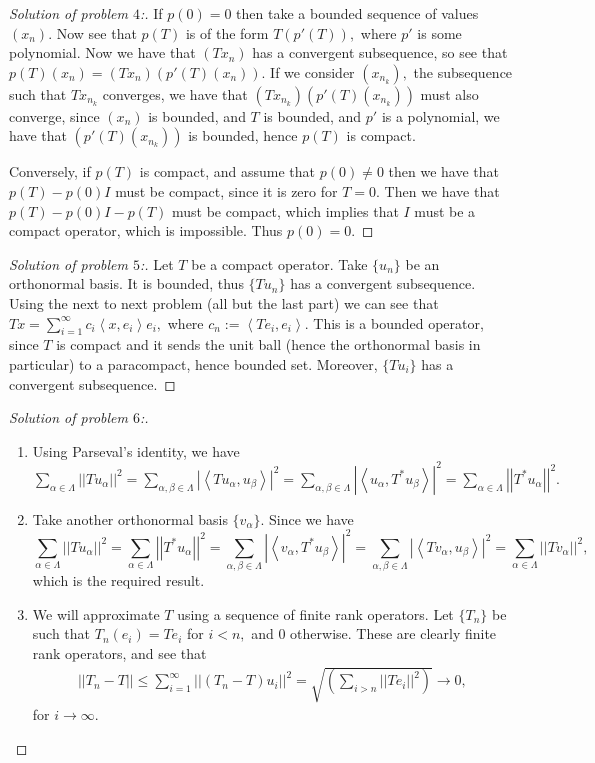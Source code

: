 \documentclass[letterpaper,11pt,twoside]{article}
\theoremstyle{proposition}
\theoremstyle{definition}
\theoremstyle{theorem}
\theoremstyle{definition}
\theoremstyle{definition}
\theoremstyle{definition}
\theoremstyle{lemma}
\theoremstyle{definition}
\theoremstyle{definition}
\theoremstyle{corollary}
\theoremstyle{definition}
\theoremstyle{definition}
\theoremstyle{definition}
\newcommand{\abs}[1]{\left \vert #1 \right \vert}
\newcommand{\gen}[1]{\left\langle #1\right\rangle}
\newcommand{\norm}[1]{\left \vert \left \vert #1 \right \vert \right \vert}
\begin{document}
	\begin{proof}[Solution of problem $4$:]
	If $p(0)=0$ then take a bounded sequence of values $(x_n).$ Now see that $p(T)$ is of the form $T(p'(T)),$ where $p'$ is some polynomial. 
	Now we have that $(Tx_n)$ has a convergent subsequence, so see that $p(T)(x_n)= (Tx_n)(p'(T)(x_n)).$ If we consider $(x_{n_k}),$ the subsequence such 
	that $ Tx_{n_k} $ converges, we have that $(Tx_{n_k})(p'(T)(x_{n_k}))$ must also converge, since $(x_n)$ is bounded, and $T$ is bounded, and $p'$ is a 
	polynomial, we have that $(p'(T)(x_{n_k}))$ is bounded, hence $p(T)$ is compact. 
	
	Conversely, if $p(T)$ is compact, and assume that $p(0) \neq 0$ then we have that $p(T)-p(0)I$ must be compact, since it is zero for $T=0.$ Then we have 
	that $ p(T)-p(0)I - p(T) $ must be compact, which implies that $I$ must be a compact operator, which is impossible. Thus $p(0)=0.$
\end{proof}
	\begin{proof}[Solution of problem $5$:]
	Let $T$ be a compact operator. Take $\{u_n\}$ be an orthonormal basis. It is bounded, thus $\{Tu_n\}$ has a convergent subsequence. Using the next to 
	next problem (all but the last part) we can see that $Tx= \sum_{i=1}^{\infty}c_i\gen{x,e_i}e_i,$ where $c_n:= \gen{Te_i,e_i}.$ This is a bounded 
	operator, since $T$ is compact and it sends the unit ball (hence the orthonormal basis in particular) to a paracompact, hence bounded set. Moreover, 
	$\{Tu_i\}$ has a convergent subsequence. 
\end{proof}
	\begin{proof}[Solution of problem $6$:]
	\begin{enumerate}
		\item Using Parseval's identity, we have $\sum_{\alpha \in \Lambda} \norm{Tu_{\alpha}}^2= \sum_{\alpha, \beta \in \Lambda} \abs{ \gen{ 
		Tu_{\alpha},u_{\beta} } }^2= \sum_{\alpha, \beta \in \Lambda} \abs{ \gen{ u_{\alpha},T^*u_{\beta} } }^2= \sum_{\alpha \in \Lambda} 
		\norm{T^*u_{\alpha}}^2.$
		\item Take another orthonormal basis $\{v_\alpha\}.$ Since we have $$\sum_{\alpha \in \Lambda} \norm{Tu_{\alpha}}^2= \sum_{\alpha \in \Lambda} 
		\norm{T^*u_{\alpha}}^2= \sum_{\alpha, \beta \in \Lambda} \abs{ \gen{ v_{\alpha},T^*u_{\beta} } }^2= \sum_{\alpha, \beta \in \Lambda} \abs{ \gen{ 
		Tv_{\alpha},u_{\beta} } }^2=  \sum_{\alpha \in \Lambda} \norm{Tv_{\alpha}}^2,$$ which is the required result.
		
		\item We will approximate $T$ using a sequence of finite rank operators. Let $\{T_n\}$ be such that $T_n(e_i)= Te_i$ for $ i < n, $ and $0$ 
		otherwise. These are clearly finite rank operators, and see that 
		\begin{align*}
			\norm{T_n - T} \leq \sum_{i=1}^{\infty} \norm{(T_n-T)u_{i}}^2 = \sqrt{\left( \sum_{i > n} \norm{Te_i}^2 \right)} \to 0,
		\end{align*}
	for $i \to \infty.$ 
	\end{enumerate}
\end{proof}
\end{document}
